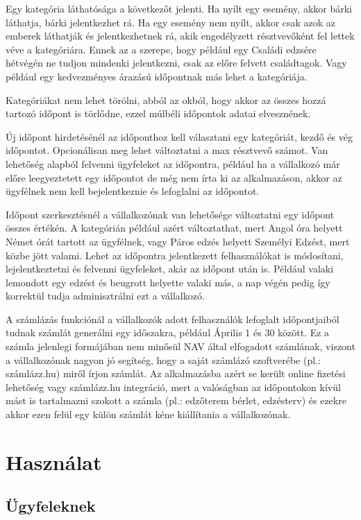 Egy kategória láthatósága a következőt jelenti. Ha nyílt egy esemény, akkor bárki láthatja, bárki jelentkezhet rá. Ha egy esemény nem nyílt, akkor csak azok az emberek láthatják és jelentkezhetnek rá, akik engedélyzett résztvevőként fel lettek véve a kategóriára. Ennek az a szerepe, hogy például egy Családi edzsére hétvégén ne tudjon mindenki jelentkezni, csak az előre felvett családtagok. Vagy például egy kedvezményes árazású időpontnak más lehet a kategóriája.

Kategóriákat nem lehet törölni, abból az okból, hogy akkor az összes hozzá tartozó időpont is törlődne, ezzel múlbéli időpontok adatai elvesznének.

Új időpont hirdetésénél az időponthoz kell választani egy kategóriát, kezdő és vég időpontot. Opcionálisan meg lehet változtatni a max résztvevő számot. Van lehetőség alapból felvenni ügyfeleket az időpontra, például ha a vállalkozó már előre leegyeztetett egy időpontot de még nem írta ki az alkalmazáson, akkor az ügyfélnek nem kell bejelentkeznie és lefoglalni az időpontot.

Időpont szerkesztésnél a vállalkozónak van lehetősége változtatni egy időpont összes értékén. A kategórián például azért változtathat, mert Angol óra helyett Német órát tartott az ügyfélnek, vagy Páros edzés helyett Személyi Edzést, mert közbe jött valami. Lehet az időpontra jelentkezett felhasználókat is módosítani, lejelentkeztetni és felvenni ügyfeleket, akár az időpont után is. Például valaki lemondott egy edzést és beugrott helyette valaki más, a nap végén pedig így korrektül tudja adminisztrálni ezt a vállalkozó.

A számlázás funkciónál a vállalkozók adott felhasználók lefoglalt időpontjaiból tudnak számlát generálni egy időszakra, például Április 1 és 30 között. Ez a számla jelenlegi formájában nem minősül NAV által elfogadott számlának, viszont a vállalkozónak nagyon jó segítség, hogy a saját számlázó szoftverébe (pl.: számlázz.hu) miről írjon számlát. Az alkalmazásba azért se került online fizetési lehetőség vagy számlázz.hu integráció, mert a valóságban az időpontokon kívül mást is tartalmazni szokott a számla (pl.: edzőterem bérlet, edzésterv) és ezekre akkor ezen felül egy külön számlát kéne kiállítania a vállalkozónak.

\section{Használat}

\subsection{Ügyfeleknek}

